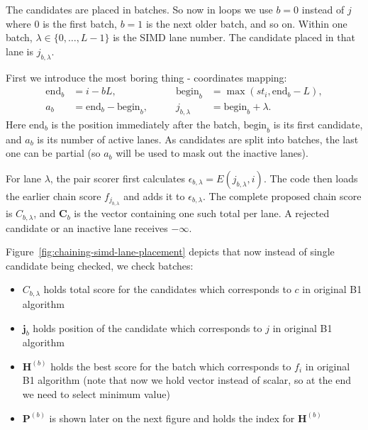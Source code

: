 The candidates are placed in batches. So now in loops we use \(b=0\) instead of $j$ where $0$ is the first batch, \(b=1\) is the next older
batch, and so on.  Within one batch,
\(\lambda\in\{0,\ldots,L-1\}\) is the SIMD lane number.  The candidate
placed in that lane is \(j_{b,\lambda}\).

First we introduce the most boring thing - coordinates mapping:
\begin{equation}
\begin{aligned}
  \mathrm{end}_b   &= i-bL,
  &\qquad \mathrm{begin}_b &= \max(st_i,\mathrm{end}_b-L),\\
  a_b              &= \mathrm{end}_b-\mathrm{begin}_b,
  &\qquad j_{b,\lambda} &= \mathrm{begin}_b+\lambda .
\end{aligned}
  \label{eq:chaining-simd-batch-map}
\end{equation}
Here \(\mathrm{end}_b\) is the position immediately after the batch,
\(\mathrm{begin}_b\) is its first candidate, and \(a_b\) is its number of
active lanes. As candidates are split into batches, the last one can be partial (so $a_b$ will be used to mask out the inactive lanes).

For lane \(\lambda\), the pair scorer first calculates
\(\epsilon_{b,\lambda}=E(j_{b,\lambda},i)\).  The code then loads the earlier
chain score \(f_{j_{b,\lambda}}\) and adds it to \(\epsilon_{b,\lambda}\).
The complete proposed chain score is \(C_{b,\lambda}\), and
\(\mathbf C_b\) is the vector containing one such total per lane.  A rejected
candidate or an inactive lane receives \(-\infty\).

Figure~\ref{fig:chaining-simd-lane-placement} depicts that now instead of single candidate being checked, we check batches:
\begin{itemize}
    \item \(C_{b,\lambda}\) holds total score for the candidates which corresponds to $c$ in original B1 algorithm
    \item \(\mathbf j_b\) holds position of the candidate which corresponds to $j$ in original B1 algorithm
    \item \(\mathbf H^{(b)}\) holds the best score for the batch which corresponds to $f_i$ in original B1 algorithm (note that now we hold vector instead of scalar, so at the end we need to select minimum value)
    \item \(\mathbf P^{(b)}\) is shown later on the next figure and holds the index for \(\mathbf H^{(b)}\)
\end{itemize}

